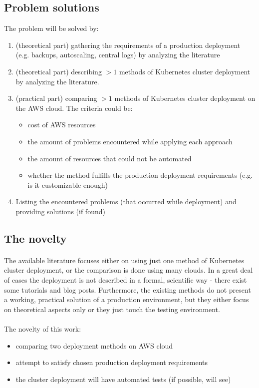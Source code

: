 \documentclass[12pt]{article}
\begin{document}
\subsection{Problem solutions}
The problem will be solved by:
\begin{enumerate}
    \item (theoretical part) gathering the requirements of a production deployment (e.g. backups, autoscaling, central logs) by analyzing the literature
    \item (theoretical part) describing $>1$ methods of Kubernetes cluster deployment by analyzing the literature. 
    \item (practical part) comparing $>1$ methods of Kubernetes cluster deployment on the AWS cloud. The criteria could be:
    \begin{itemize}
        \item cost of AWS resources
        \item the amount of problems encountered while applying each approach
        \item the amount of resources that could not be automated
        \item whether the method fulfills the production deployment requirements (e.g. is it customizable enough)
    \end{itemize}
    \item Listing the encountered problems (that occurred while deployment) and providing solutions (if found)
\end{enumerate}


\subsection{The novelty}
\paragraph{}
The available literature focuses either on using just one method of Kubernetes cluster deployment, or the comparison is done using many clouds. In a great deal of cases the deployment is not described in a formal, scientific way - there exist some tutorials and blog posts. Furthermore, the existing methods do not present a working, practical solution of a production environment, but they either focus on theoretical aspects only or they just touch the testing environment.
\paragraph{}
The novelty of this work:
\begin{itemize}
    \item comparing two deployment methods on AWS cloud
    \item attempt to satisfy chosen production deployment requirements
    \item the cluster deployment will have automated tests (if possible, will see)
\end{itemize}
\end{document}
